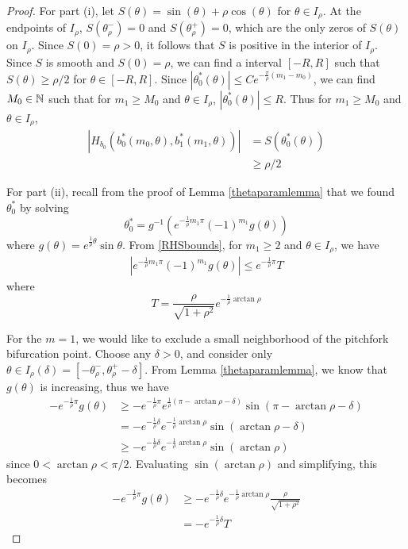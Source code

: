 \documentclass[thesis.tex]{subfiles}
\begin{document}
\begin{lemma}
\begin{proof}
For part (i), let $S(\theta) = \sin(\theta) + \rho \cos(\theta)$ for $\theta \in I_\rho$. At the endpoints of $I_\rho$, $S(\theta_\rho^-) = 0$ and $S(\theta_\rho^+) = 0$, which are the only zeros of $S(\theta)$ on $I_\rho$. Since $S(0) = \rho > 0$, it follows that $S$ is positive in the interior of $I_\rho$. Since $S$ is smooth and $S(0) = \rho$, we can find a interval $[-R,R]$ such that $S(\theta) \geq \rho/2$ for $\theta \in [-R,R]$. Since $|\theta_0^*(\theta)| \leq C e^{ -\frac{\pi}{\rho}(m_1 - m_0)}$, we can find $M_0 \in {\mathbb N}$ such that for $m_1 \geq M_0$ and $\theta \in I_\rho$, $|\theta_0^*(\theta)| \leq R$. Thus for $m_1 \geq M_0$ and $\theta \in I_\rho$,
\begin{align*}
|H_{b_0}(b_0^*(m_0, \theta), b_1^*(m_1, \theta))| 
&= S(\theta_0^*(\theta)) \\
&\geq \rho/2
\end{align*}

For part (ii), recall from the proof of Lemma \ref{thetaparamlemma} that we found $\theta_0^*$ by solving
\begin{equation*}
\theta_0^* = g^{-1}\left( e^{ -\frac{1}{\rho} m_1 \pi } (-1)^{m_1} g(\theta) \right)
\end{equation*}
where $g(\theta) = e^{ \frac{1}{\rho} \theta } \sin \theta$. From \eqref{RHSbounds}, for $m_1 \geq 2$ and $\theta \in I_\rho$, we have 
\begin{align}\label{RHSboundgeq2}
|e^{ -\frac{1}{\rho} m_1 \pi } (-1)^{m_1} g(\theta)| \leq e^{ -\frac{1}{\rho} \pi } T
\end{align}
where
\begin{equation*}\label{defT}
T = \frac{\rho}{\sqrt{1+\rho^2}}e^{-\frac{1}{\rho}\arctan \rho}
\end{equation*}

For the $m = 1$, we would like to exclude a small neighborhood of the pitchfork bifurcation point. Choose any $\delta > 0$, and consider only $\theta \in I_\rho(\delta) = [-\theta_\rho^-, \theta_\rho^+ - \delta]$. From Lemma \ref{thetaparamlemma}, we know that $g(\theta)$ is increasing, thus we have
\begin{align*}
-e^{ -\frac{1}{\rho} \pi } g(\theta) &\geq 
 -e^{ -\frac{1}{\rho} \pi } e^{ \frac{1}{\rho}(\pi - \arctan \rho - \delta) } \sin(\pi - \arctan \rho - \delta) \\
&= -e^{-\frac{1}{\rho}\delta} e^{-\frac{1}{\rho}\arctan\rho}\sin(\arctan \rho - \delta) \\
&\geq -e^{-\frac{1}{\rho}\delta} e^{-\frac{1}{\rho}\arctan\rho}\sin(\arctan \rho)
\end{align*}
since $0 < \arctan \rho < \pi/2$. Evaluating $\sin(\arctan\rho)$ and simplifying, this becomes
\begin{align*}
-e^{ -\frac{1}{\rho} \pi } g(\theta)
&\geq -e^{-\frac{1}{\rho}\delta} e^{-\frac{1}{\rho}\arctan\rho}\frac{\rho}{\sqrt{1 + \rho^2}} \\
&= -e^{-\frac{1}{\rho}\delta} T
\end{align*}


\end{proof}
\end{lemma}
\end{document}
